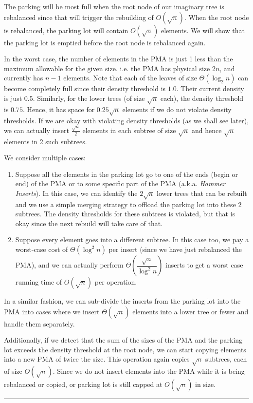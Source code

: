 \documentclass{article}
\newenvironment{proof}{{\bf Proof:  }}{\hfill\rule{2mm}{2mm}}
\begin{document}
\begin{proof}
The parking will be most full when the root node of our imaginary tree
is rebalanced since that will trigger the rebuilding of
$O(\sqrt{n})$. When the root node is rebalanced, the parking lot will
contain $O(\sqrt{n})$ elements. We will show that the parking lot is
emptied before the root node is rebalanced again.

In the worst case, the number of elements in the PMA is just 1 less
than the maximum allowable for the given size. i.e. the PMA has
physical size $2n$, and currently has $n-1$ elements. Note that each
of the leaves of size $\Theta(\log_2{n})$ can become completely full
since their density threshold is $1.0$. Their current density is just
$0.5$. Similarly, for the lower trees (of size $\sqrt{n}$ each), the
density threshold is $0.75$. Hence, it has space for $0.25\sqrt{n}$
elements if we do not violate density thresholds. If we are okay with
violating density thresholds (as we shall see later), we can actually
insert $\frac{\sqrt{n}}{2}$ elements in each subtree of size
$\sqrt{n}$ and hence $\sqrt{n}$ elements in 2 such subtrees.

We consider multiple cases:

\begin{enumerate}

\item Suppose all the elements in the parking lot go to one of the
  ends (begin or end) of the PMA or to some specific part of the PMA
  (a.k.a. \textit{Hammer Inserts}). In this case, we can identify the
  $2\sqrt{n}$ lower trees that can be rebuilt and we use a simple
  merging strategy to offload the parking lot into these 2
  subtrees. The density thresholds for these subtrees is violated, but
  that is okay since the next rebuild will take care of that.

\item Suppose every element goes into a different subtree. In this
  case too, we pay a worst-case cost of $\Theta(\log^2{n})$ per insert
  (since we have just rebalanced the PMA), and we can actually perform
  $\Theta\left(\dfrac{\sqrt{n}}{\log^2{n}}\right)$ inserts to get a
  worst case running time of $O(\sqrt{n})$ per operation.

\end{enumerate}

In a similar fashion, we can sub-divide the inserts from the parking
lot into the PMA into cases where we insert $\Theta(\sqrt{n})$
elements into a lower tree or fewer and handle them separately.

Additionally, if we detect that the sum of the sizes of the PMA and
the parking lot exceeds the density threshold at the root node, we can
start copying elements into a new PMA of twice the size. This
operation again copies $\sqrt{n}$ subtrees, each of size
$O(\sqrt{n})$. Since we do not insert elements into the PMA while it
is being rebalanced or copied, or parking lot is still capped at
$O(\sqrt{n})$ in size.

\end{proof}
\end{document}
